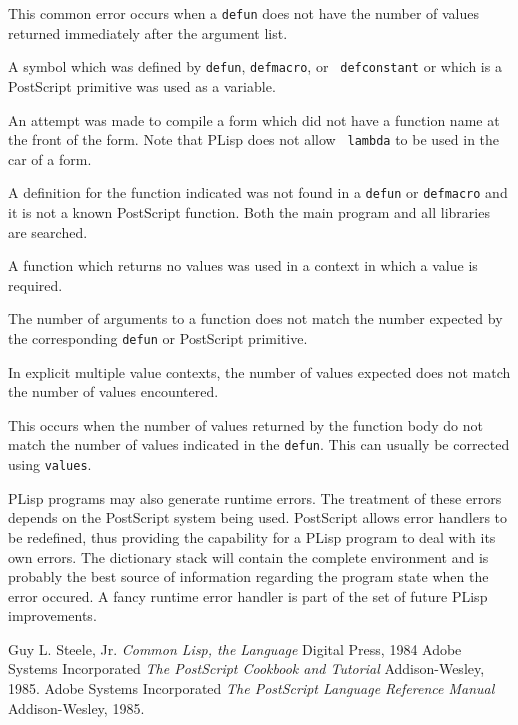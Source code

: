 {This common error occurs when a {\tt defun} does not have the number
of values returned immediately after the argument list.}

{A symbol which was defined by {\tt defun}, {\tt defmacro}, or {\tt
defconstant} or which
is a PostScript primitive was used as a variable.}

{An attempt was made to compile a form which did not have a function
name at the front of the form.  Note that PLisp does not allow {\tt
lambda} to be used in the car of a form.}

{A definition for the function indicated was not found in a {\tt defun}
or {\tt defmacro} and it is not a known PostScript function.  Both the
main program and all libraries are searched.}

{A function which returns no values was used in a context in which a
value is required.}

{The number of arguments to a function does not match the number
expected by the corresponding {\tt defun} or PostScript primitive.}

{In explicit multiple value contexts, the number of values expected
does not match the number of values encountered.}

{This occurs when the number of values returned by the function body do
not match the number of values indicated in the {\tt defun}.  This can
usually be corrected using {\tt values}.}

PLisp programs may also generate runtime errors.  The treatment of
these errors depends on the PostScript system being used.  PostScript
allows error handlers to be redefined, thus providing the capability
for a PLisp program to deal with its own errors.  The dictionary stack
will contain the complete environment and is probably the best source
of information regarding the program state when the error occured.  A
fancy runtime error handler is part of the set of future PLisp
improvements.

\begin{thebibliography}{99}
 Guy L. Steele, Jr.
{\em Common Lisp, the Language}
Digital Press, 1984
 Adobe Systems Incorporated
{\em The PostScript Cookbook and Tutorial}
Addison-Wesley, 1985.
 Adobe Systems Incorporated
{\em The PostScript Language Reference Manual}
Addison-Wesley, 1985.
\end{thebibliography}




